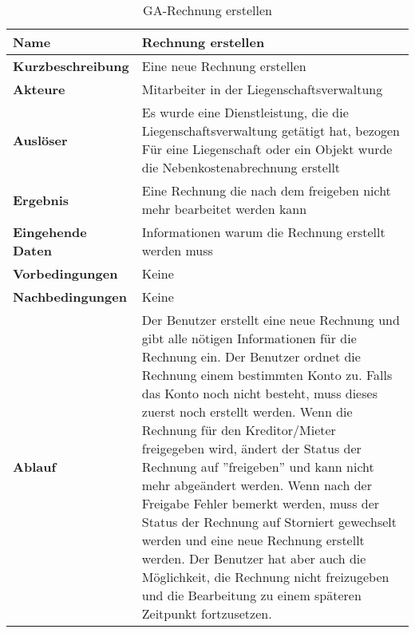\begin{table}[H]
  \centering
  \settowidth{}
  \setlength\extrarowheight{2pt}
  \begin{tabulary}{1.0\textwidth}{|a|m{12cm}|}
    \hline
    \textbf{Name}&Rechnung erstellen\\
    \hline 
    \textbf{Kurzbeschreibung} & Eine neue Rechnung erstellen\\
    \hline
    \textbf{Akteure} & Mitarbeiter in der Liegenschaftsverwaltung\\
    \hline
    \textbf{Auslöser} & Es wurde eine Dienstleistung, die die Liegenschaftsverwaltung getätigt hat, bezogen \newline 
    Für eine Liegenschaft oder ein Objekt wurde die Nebenkostenabrechnung erstellt\\
    \hline
    \textbf{Ergebnis} & Eine Rechnung die nach dem freigeben nicht mehr bearbeitet werden kann\\
    \hline
    \textbf{Eingehende Daten} & Informationen warum die Rechnung erstellt werden muss \\
    \hline
    \textbf{Vorbedingungen} & Keine\\
    \hline
    \textbf{Nachbedingungen} & Keine\\
    \hline
    \textbf{Ablauf} & Der Benutzer erstellt eine neue Rechnung und gibt alle nötigen Informationen für die Rechnung ein. Der Benutzer ordnet die Rechnung einem bestimmten Konto zu. Falls das Konto noch nicht besteht, muss dieses zuerst noch erstellt werden. Wenn die Rechnung für den Kreditor/Mieter freigegeben wird, ändert der Status der Rechnung auf ''freigeben'' und kann nicht mehr abgeändert werden. Wenn nach der Freigabe Fehler bemerkt werden, muss der Status der Rechnung auf Storniert gewechselt werden und eine neue Rechnung erstellt werden. Der Benutzer hat aber auch die Möglichkeit, die Rechnung nicht freizugeben und die Bearbeitung zu einem späteren Zeitpunkt fortzusetzen.\\
    \hline
  \end{tabulary}
  \caption{GA-Rechnung erstellen}
  \label{GA-rechnungErstellen}
\end{table}